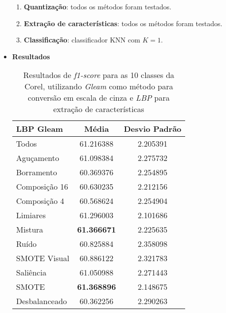 \begin{itemize}
\begin{enumerate}
\item \textbf{Quantização}: todos os métodos foram testados.
\item \textbf{Extração de características}: todos os métodos foram testados.
\item \textbf{Classificação}: classificador KNN com $K=1$.
\end{enumerate}

\item[] \textbf{Resultados}

%

\begin{table}[!htbp]
\centering
\caption{Resultados de \textit{f1-score} para as 10 classes da Corel, utilizando \emph{Gleam} como método para conversão em escala de cinza e \emph{LBP} para extração de características}
\label{tab:resultados:3.1}
\begin{tabular}{|l|c|c|}
\hline
\textbf{LBP Gleam} & \textbf{Média}     & \textbf{Desvio Padrão} \\ \hline
   Todos        &  61.216388 &  2.205391  \\ \hline
  Aguçamento    &  61.098384 &  2.275732  \\ \hline
  Borramento    &  60.369376 &  2.254895  \\ \hline
  Composição 16 &  60.630235 &  2.212156  \\ \hline
  Composição 4  &  60.568624 &  2.254904  \\ \hline
  Limiares      &  61.296003 &  2.101686  \\ \hline
  Mistura       &  \textbf{61.366671} &  2.225635  \\ \hline
  Ruído         &  60.825884 &  2.358098  \\ \hline
  SMOTE Visual  &  60.886122 &  2.321783  \\ \hline
  Saliência     &  61.050988 &  2.271443  \\ \hline
 SMOTE          &  \textbf{61.368896} &  2.148675  \\ \hline
Desbalanceado   &  60.362256 &  2.290263  \\ \hline
\end{tabular}
\end{table}


\end{itemize}
